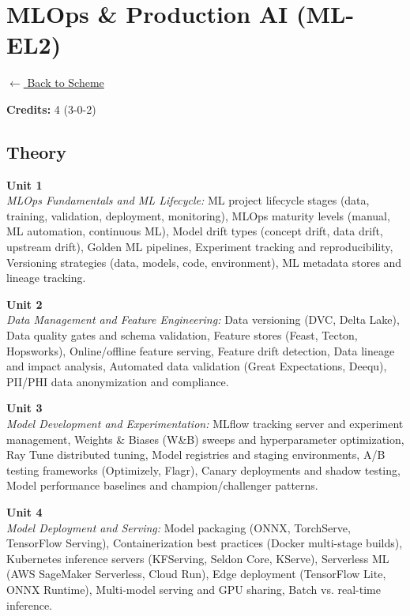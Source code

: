 \section*{MLOps \& Production AI (ML-EL2)}
\label{elec:ML_2}

\noindent \small{\hyperref[main:scheme]{$\leftarrow$ Back to Scheme}} \vspace{0.5cm}

\noindent \textbf{Credits:} 4 (3-0-2)

\subsection*{Theory}
\noindent\textbf{Unit 1} \\
\textit{MLOps Fundamentals and ML Lifecycle:} ML project lifecycle stages (data, training, validation, deployment, monitoring), MLOps maturity levels (manual, ML automation, continuous ML), Model drift types (concept drift, data drift, upstream drift), Golden ML pipelines, Experiment tracking and reproducibility, Versioning strategies (data, models, code, environment), ML metadata stores and lineage tracking.

\vspace{0.3cm}

\noindent\textbf{Unit 2} \\
\textit{Data Management and Feature Engineering:} Data versioning (DVC, Delta Lake), Data quality gates and schema validation, Feature stores (Feast, Tecton, Hopsworks), Online/offline feature serving, Feature drift detection, Data lineage and impact analysis, Automated data validation (Great Expectations, Deequ), PII/PHI data anonymization and compliance.

\vspace{0.3cm}

\noindent\textbf{Unit 3} \\
\textit{Model Development and Experimentation:} MLflow tracking server and experiment management, Weights \& Biases (W\&B) sweeps and hyperparameter optimization, Ray Tune distributed tuning, Model registries and staging environments, A/B testing frameworks (Optimizely, Flagr), Canary deployments and shadow testing, Model performance baselines and champion/challenger patterns.

\vspace{0.3cm}

\noindent\textbf{Unit 4} \\
\textit{Model Deployment and Serving:} Model packaging (ONNX, TorchServe, TensorFlow Serving), Containerization best practices (Docker multi-stage builds), Kubernetes inference servers (KFServing, Seldon Core, KServe), Serverless ML (AWS SageMaker Serverless, Cloud Run), Edge deployment (TensorFlow Lite, ONNX Runtime), Multi-model serving and GPU sharing, Batch vs. real-time inference.

